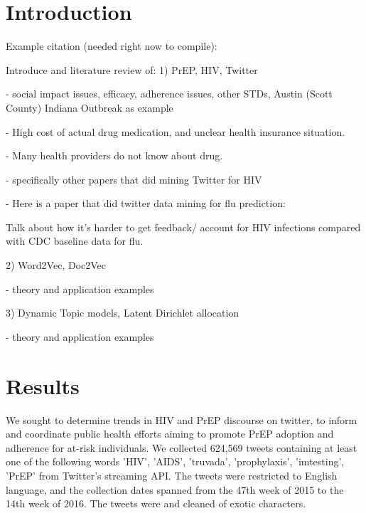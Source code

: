 \documentclass{sig-alternate-05-2015}
\begin{document}
%
%
\begin{CCSXML}

\end{CCSXML}


%
%

%
%
\printccsdesc



\section{Introduction}
Example citation (needed right now to compile):\cite{Lamport:LaTeX}

Introduce and literature review of:
1) PrEP, HIV, Twitter

 - social impact issues, efficacy, adherence issues, other STDs, Austin (Scott County) Indiana Outbreak as example
 
 - High cost of actual drug medication, and unclear health insurance situation.
 
 - Many health providers do not know about drug.
 
 - specifically other papers that did mining Twitter for HIV
 
 - Here is a paper that did twitter data mining for flu prediction:
 
 
 Talk about how it's harder to get feedback/ account for HIV infections compared with CDC baseline data for flu.


2) Word2Vec, Doc2Vec

 - theory and application examples

3) Dynamic Topic models, Latent Dirichlet allocation

- theory and application examples

\section{Results}



We sought to determine trends in HIV and PrEP discourse on twitter, to inform and coordinate public health efforts aiming to promote PrEP adoption and adherence for at-risk individuals. We collected 624,569 tweets containing at least one of the following words 'HIV', 'AIDS', 'truvada', 'prophylaxis', 'imtesting', 'PrEP' from Twitter's streaming API. The tweets were restricted to English language, and the collection dates spanned from the 47th week of 2015 to the 14th week of 2016. The tweets were and cleaned of exotic characters.
\end{document}
